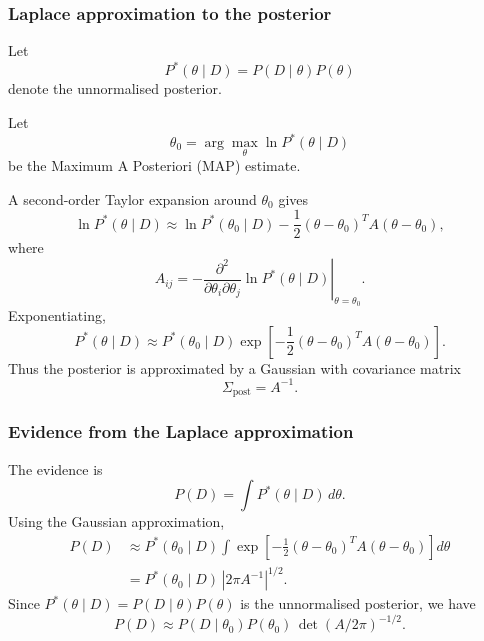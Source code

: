 \documentclass[11pt, titlepage]{article} %
\numberwithin{equation}{section}
\theoremstyle{definition}
\numberwithin{assumption}{section}
\begin{document}
\subsubsection*{Laplace approximation to the posterior}

Let
\begin{equation*}
    P^*(\theta\mid D)=P(D\mid \theta)P(\theta)
\end{equation*}
denote the unnormalised posterior.

Let
\begin{equation*}
    \theta_0=\arg\max_\theta \ln P^*(\theta\mid D)
\end{equation*}
be the Maximum A Posteriori (MAP) estimate.

A second-order Taylor expansion around $\theta_0$ gives
\begin{equation*}
    \ln P^*(\theta\mid D)
    \approx
    \ln P^*(\theta_0\mid D)
    -\frac12(\theta-\theta_0)^T A(\theta-\theta_0),
\end{equation*}
where
\begin{equation*}
    A_{ij}
    =
    -\left.
    \frac{\partial^2}{\partial \theta_i \partial \theta_j}
    \ln P^*(\theta\mid D)
    \right|_{\theta=\theta_0}.
\end{equation*}
Exponentiating,
\begin{equation*}
    P^*(\theta\mid D)
    \approx
    P^*(\theta_0\mid D)
    \exp\!\left[
    -\frac12(\theta-\theta_0)^T A(\theta-\theta_0)
    \right].
\end{equation*}
Thus the posterior is approximated by a Gaussian with covariance matrix
\begin{equation*}
    \Sigma_{\mathrm{post}}=A^{-1}.
\end{equation*}

\subsubsection*{Evidence from the Laplace approximation}

The evidence is
\begin{equation*}
    P(D)=\int P^*(\theta\mid D)\,d\theta.
\end{equation*}
Using the Gaussian approximation,
\begin{align*}
    P(D)
    &\approx
    P^*(\theta_0\mid D)
    \int
    \exp\!\left[
    -\frac12(\theta-\theta_0)^T A(\theta-\theta_0)
    \right]d\theta\\
    &=
    P^*(\theta_0\mid D)\,|2\pi A^{-1}|^{1/2}.
\end{align*}
Since $P^*(\theta\mid D)=P(D\mid \theta)P(\theta)$ is the unnormalised posterior, we have
\begin{equation*}
    P(D)
    \approx
    P(D\mid \theta_0)P(\theta_0)\,\det(A/2\pi)^{-1/2}.
\end{equation*}
\end{document}
